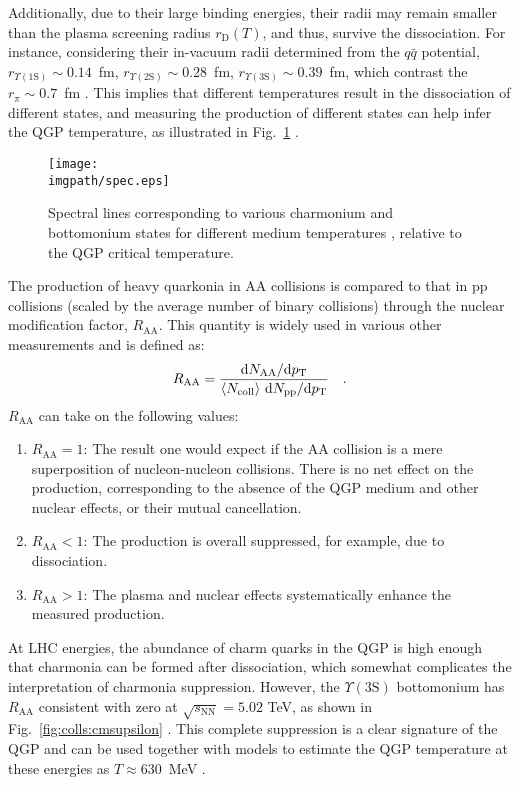 Additionally, due to their large binding energies, their radii may remain smaller than the plasma screening radius $r_\mathrm{D}(T)$, and thus, survive the dissociation. For instance, considering their in-vacuum radii determined from the $q\bar{q}$ potential, $r_{\Upsilon(1\mathrm{S})}\sim 0.14$~fm, $r_{\Upsilon(2\mathrm{S})}\sim 0.28$~fm, $r_{\Upsilon(3\mathrm{S})}\sim 0.39$~fm, which contrast the $r_\pi \sim 0.7$~fm \cite{sarkarPhysicsQuarkGluonPlasma2010}. This implies that different temperatures result in the dissociation of different states, and measuring the production of different states can help infer the QGP temperature, as illustrated in Fig.~\ref{fig:colls:thermometer} \cite{matsuiSuppressionQuarkgluonPlasma1986, satzProbingStatesMatter2013}.

\begin{figure}[H]
\texttt{[image: \\imgpath/spec.eps]}
\caption{Spectral lines corresponding to various charmonium and bottomonium states for different medium temperatures , relative to the QGP critical temperature. \cite{satzProbingStatesMatter2013}}
\label{fig:colls:thermometer}
\end{figure}

The production of heavy quarkonia in AA collisions is compared to that in pp collisions (scaled by the average number of binary collisions) through the nuclear modification factor, $R_{\mathrm{AA}}$. This quantity is widely used in various other measurements and is defined as:
\begin{align}
R_{\mathrm{AA}}=\frac{\mathrm{d}N_{\mathrm{AA}}/\mathrm{d}p_{\text{T}}}{\langle N_{\mathrm{coll}}\rangle\ \mathrm{d}N_{\mathrm{pp}}/\mathrm{d}p_{\text{T}}} \quad .
\end{align}
$R_{\mathrm{AA}}$ can take on the following values:
\begin{enumerate}
\item $R_\mathrm{AA} = 1$: The result one would expect if the AA collision is a mere superposition of nucleon-nucleon collisions. There is no net effect on the production, corresponding to the absence of the QGP medium and other nuclear effects, or their mutual cancellation.
\item $R_\mathrm{AA} < 1$: The production is overall suppressed, for example, due to dissociation.
\item $R_\mathrm{AA} > 1$: The plasma and nuclear effects systematically enhance the measured production.
\end{enumerate}

At LHC energies, the abundance of charm quarks in the QGP is high enough that charmonia can be formed after dissociation, which somewhat complicates the interpretation of charmonia suppression. However, the $\Upsilon(3\mathrm{S})$ bottomonium has $R_{\mathrm{AA}}$ consistent with zero at $\sqrt{s_{\mathrm{NN}}}=5.02$ TeV, as shown in Fig.~\ref{fig:colls:cmsupsilon} \cite{cmscollaborationMeasurementNuclearModification2019}. This complete suppression is a clear signature of the QGP and can be used together with models to estimate the QGP temperature at these energies as $T\approx 630$~MeV \cite{krouppaPredictionsBottomoniaSuppression2016}.

